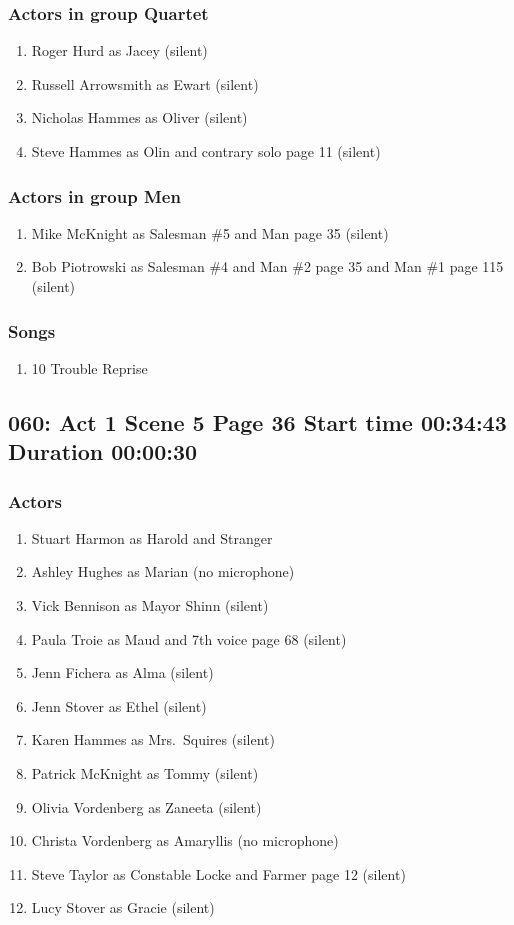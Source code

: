 \subsubsection{Actors in group Quartet}
\begin{enumerate}
\item Roger Hurd as Jacey (silent)
\item Russell Arrowsmith as Ewart (silent)
\item Nicholas Hammes as Oliver (silent)
\item Steve Hammes as Olin and contrary solo page 11 (silent)
\end{enumerate}
\subsubsection{Actors in group Men}
\begin{enumerate}
\item Mike McKnight as Salesman \#5 and Man page 35 (silent)
\item Bob Piotrowski as Salesman \#4 and Man \#2 page 35 and Man \#1 page 115 (silent)
\end{enumerate}

\subsubsection{Songs}
\begin{enumerate}
\item 10 Trouble Reprise
\end{enumerate}
\subsection{060: Act 1 Scene 5 Page 36 Start time 00:34:43 Duration 00:00:30}

\subsubsection{Actors}
\begin{enumerate}
\item Stuart Harmon as Harold and Stranger
\item Ashley Hughes as Marian (no microphone)
\item Vick Bennison as Mayor Shinn (silent)
\item Paula Troie as Maud and 7th voice page 68 (silent)
\item Jenn Fichera as Alma (silent)
\item Jenn Stover as Ethel (silent)
\item Karen Hammes as Mrs.~Squires (silent)
\item Patrick McKnight as Tommy (silent)
\item Olivia Vordenberg as Zaneeta (silent)
\item Christa Vordenberg as Amaryllis (no microphone)
\item Steve Taylor as Constable Locke and Farmer page 12 (silent)
\item Lucy Stover as Gracie (silent)
\end{enumerate}
